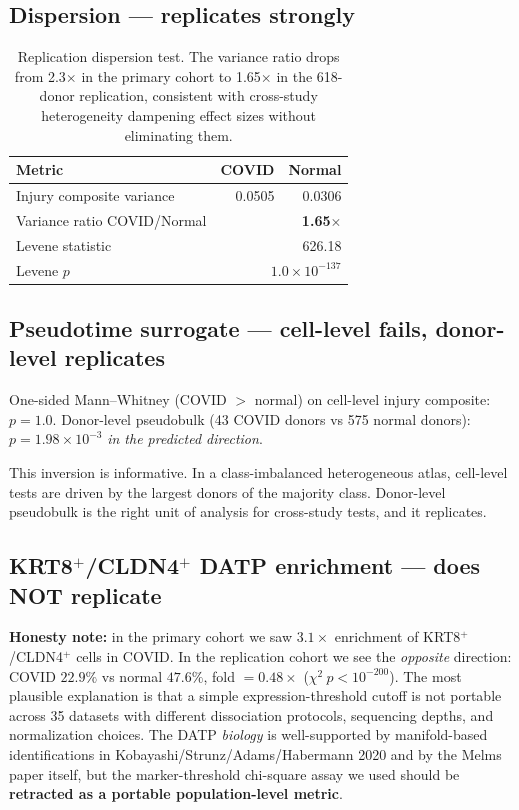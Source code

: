 \documentclass[11pt]{article}
\newcommand{\honest}[1]{\textcolor{red!70!black}{\textbf{Honesty note:} #1}}
\begin{document}
\subsection{Dispersion --- replicates strongly}

\begin{table}[H]
\centering
\begin{tabular}{lrr}
\toprule
Metric & COVID & Normal \\
\midrule
Injury composite variance & 0.0505 & 0.0306 \\
Variance ratio COVID/Normal & \multicolumn{2}{r}{\textbf{1.65$\times$}} \\
Levene statistic & \multicolumn{2}{r}{626.18} \\
Levene $p$ & \multicolumn{2}{r}{$1.0\times 10^{-137}$} \\
\bottomrule
\end{tabular}
\caption{Replication dispersion test. The variance ratio drops from 2.3$\times$
in the primary cohort to 1.65$\times$ in the 618-donor replication, consistent with
cross-study heterogeneity dampening effect sizes without eliminating them.}
\end{table}

\subsection{Pseudotime surrogate --- cell-level fails, donor-level replicates}

One-sided Mann--Whitney (COVID $>$ normal) on cell-level injury composite: $p=1.0$.
Donor-level pseudobulk (43 COVID donors vs 575 normal donors): $p=1.98\times10^{-3}$
\emph{in the predicted direction}.

This inversion is informative. In a class-imbalanced heterogeneous atlas,
cell-level tests are driven by the largest donors of the majority class. Donor-level
pseudobulk is the right unit of analysis for cross-study tests, and it replicates.

\subsection{KRT8$^+$/CLDN4$^+$ DATP enrichment --- does NOT replicate}

\honest{in the primary cohort we saw $3.1\times$ enrichment of KRT8$^+$/CLDN4$^+$ cells
in COVID. In the replication cohort we see the \emph{opposite} direction: COVID
$22.9\%$ vs normal $47.6\%$, fold $=0.48\times$ ($\chi^2\ p<10^{-200}$). The most
plausible explanation is that a simple expression-threshold cutoff is not portable
across 35 datasets with different dissociation protocols, sequencing depths, and
normalization choices. The DATP \emph{biology} is well-supported by manifold-based
identifications in Kobayashi/Strunz/Adams/Habermann 2020 and by the Melms paper itself,
but the marker-threshold chi-square assay we used should be \textbf{retracted as a
portable population-level metric}.}
\end{document}
